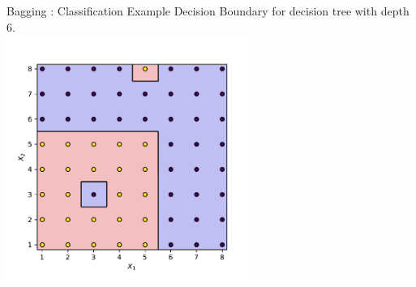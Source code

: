 \documentclass{beamer}
\begin{document}
\begin{frame}{Bagging : Classification Example}
  Decision Boundary for decision tree with depth 6.\\
  \vspace{0.5cm}
  \centering
  \includegraphics[width = 0.6\textwidth]{../assets/ensemble/figures/strong-tree}
\end{frame}
\end{document}
